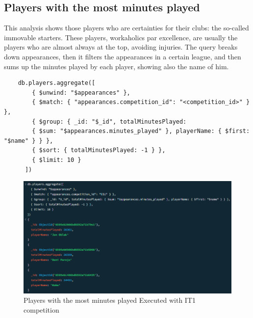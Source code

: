 \documentclass{Configuration_Files/PoliMi3i_thesis}
\begin{document}
\subsection{Players with the most minutes played}
This analysis shows those players who are certainties for their clubs: the so-called immovable starters. These players, workaholics par excellence, are usually the players who are almost always at the top, avoiding injuries. The query breaks down appearances, then it filters the appearances in a certain league, and then sums up the minutes played by each player, showing also the name of him.
\begin{verbatim}
    db.players.aggregate([
        { $unwind: "$appearances" },
        { $match: { "appearances.competition_id": "<competition_id>" } },
        { $group: { _id: "$_id", totalMinutesPlayed: 
        { $sum: "$appearances.minutes_played" }, playerName: { $first: "$name" } } },
        { $sort: { totalMinutesPlayed: -1 } },
        { $limit: 10 }
      ])      
\end{verbatim}
\begin{figure}[htbp]
    \centering
    \includegraphics[scale=1]{Images/Queries/Competitions_statistics/minutes-played/ES1.png}
    \caption{Players with the most minutes played Executed with IT1 competition}
\end{figure}
\end{document}
